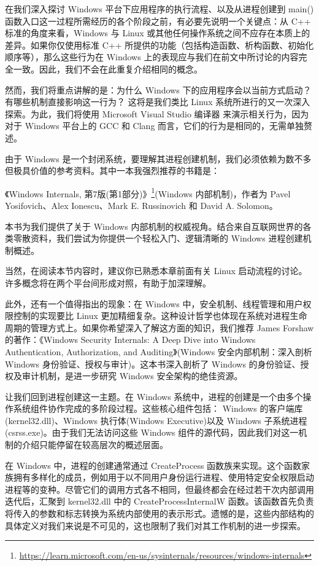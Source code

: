 
在我们深入探讨 Windows 平台下应用程序的执行流程、以及从进程创建到 main() 函数入口这一过程所需经历的各个阶段之前，有必要先说明一个关键点：从 C++ 标准的角度来看，Windows 与 Linux 或其他任何操作系统之间不应存在本质上的差异。如果你仅使用标准 C++ 所提供的功能（包括构造函数、析构函数、初始化顺序等），那么这些行为在 Windows 上的表现应与我们在前文中所讨论的内容完全一致。因此，我们不会在此重复介绍相同的概念。

然而，我们将重点讲解的是：为什么 Windows 下的应用程序会以当前方式启动？有哪些机制直接影响这一行为？ 这将是我们类比 Linux 系统所进行的又一次深入探索。为此，我们将使用 Microsoft Visual Studio 编译器 来演示相关行为，因为对于 Windows 平台上的 GCC 和 Clang 而言，它们的行为是相同的，无需单独赘述。

由于 Windows 是一个封闭系统，要理解其进程创建机制，我们必须依赖为数不多但极具价值的参考资料。其中一本我强烈推荐的书籍是：

《Windows Internals, 第7版(第1部分)》\footnote{\url{https://learn.microsoft.com/en-us/sysinternals/resources/windows-internals}}(Windows 内部机制)，作者为 Pavel Yosifovich、Alex Ionescu、Mark E. Russinovich 和 David A. Solomon。

本书为我们提供了关于 Windows 内部机制的权威视角。结合来自互联网世界的各类零散资料，我们尝试为你提供一个轻松入门、逻辑清晰的 Windows 进程创建机制概述。

当然，在阅读本节内容时，建议你已熟悉本章前面有关 Linux 启动流程的讨论。许多概念将在两个平台间形成对照，有助于加深理解。

此外，还有一个值得指出的现象：在 Windows 中，安全机制、线程管理和用户权限控制的实现要比 Linux 更加精细复杂。这种设计哲学也体现在系统对进程生命周期的管理方式上。如果你希望深入了解这方面的知识，我们推荐 James Forshaw 的著作：《Windows Security Internals: A Deep Dive into Windows Authentication, Authorization, and Auditing》(Windows 安全内部机制：深入剖析 Windows 身份验证、授权与审计)。这本书深入剖析了 Windows 的身份验证、授权及审计机制，是进一步研究 Windows 安全架构的绝佳资源。

让我们回到进程创建这一主题。在 Windows 系统中，进程的创建是一个由多个操作系统组件协作完成的多阶段过程。这些核心组件包括： Windows 的客户端库(kernel32.dll)、Windows 执行体(Windows Executive)以及 Windows 子系统进程(csrss.exe)。由于我们无法访问这些 Windows 组件的源代码，因此我们对这一机制的介绍只能停留在较高层次的概述层面。

在 Windows 中，进程的创建通常通过 CreateProcess 函数族来实现。这个函数家族拥有多样化的成员，例如用于以不同用户身份运行进程、使用特定安全权限启动进程等的变种。尽管它们的调用方式各不相同，但最终都会在经过若干次内部调用迭代后，汇聚到 kernel32.dll 中的 CreateProcessInternalW 函数。该函数首先负责将传入的参数和标志转换为系统内部使用的表示形式。遗憾的是，这些内部结构的具体定义对我们来说是不可见的，这也限制了我们对其工作机制的进一步探索。


